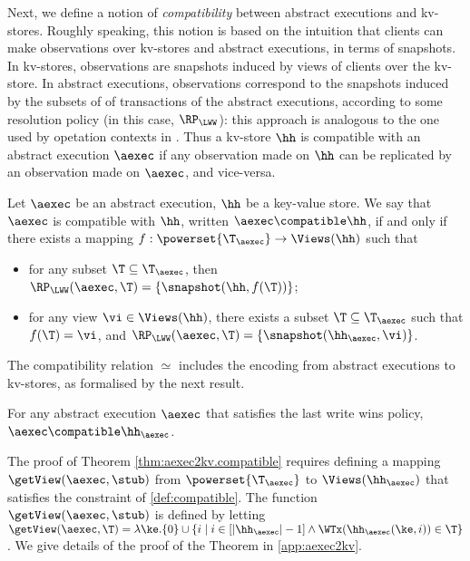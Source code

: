 Next, we define a notion of \emph{compatibility} between abstract executions and 
kv-stores. Roughly speaking, 
this notion is based on the intuition that clients can make observations over kv-stores and abstract 
executions, in terms of snapshots. In kv-stores, 
observations are snapshots induced by views of clients over the kv-store. 
In abstract executions, observations correspond to the snapshots induced by the subsets of
of transactions of the abstract executions, according to some resolution policy (in this 
case, $\RP_{\LWW}$): this approach is analogous to the one used by 
opetation contexts in \cite{repldatatypes}. Thus a kv-store $\hh$ is 
compatible with an abstract execution $\aexec$ if any observation 
made on $\hh$ can be replicated by an observation made on 
$\aexec$, and vice-versa. 

\begin{definition}
\label{def:compatible}
Let $\aexec$ be an abstract execution, $\hh$ be a key-value store. 
We say that $\aexec$ is compatible with $\hh$, written 
$\aexec \compatible \hh$, if and only if there exists a  mapping 
$f: \powerset{\T_{\aexec}} \rightarrow \Views(\hh)$
such that  
\begin{itemize}
\item for any subset $\T \subseteq \T_{\aexec}$, then $\RP_{\LWW}(\aexec, \T) = \{\snapshot(\hh, f(\T))\}$; 
\item for any view $\vi \in \Views(\hh)$, there exists a subset $\T \subseteq \T_{\aexec}$ 
such that $f(\T) = \vi$, and $\RP_{\LWW}(\aexec, \T) = \{\snapshot(\hh_{\aexec}, \vi)\}$.
\end{itemize}
\end{definition}

The compatibility relation $\simeq$ includes the encoding from abstract executions to kv-stores, 
as formalised by the next result.
\begin{theorem}
\label{thm:aexec2kv.compatible}
For any abstract execution $\aexec$ that satisfies the last write wins policy, $\aexec \compatible \hh_{\aexec}$.
\end{theorem}

The proof of Theorem \ref{thm:aexec2kv.compatible} requires defining a mapping 
$\getView(\aexec, \stub)$ from $\powerset{\T_{\aexec}}$ to $\Views(\hh_{\aexec})$ 
that satisfies the constraint of \cref{def:compatible}.
The function $\getView(\aexec, \stub)$ is defined by letting 
$\getView(\aexec, \T) = \lambda \ke. \{0\} \cup \{ i \mid i \in [\lvert \hh_{\aexec} \rvert - 1] \wedge 
\WTx(\hh_{\aexec}(\ke, i)) \in \T\}$.
We give details of the proof of the Theorem in \cref{app:aexec2kv}.


